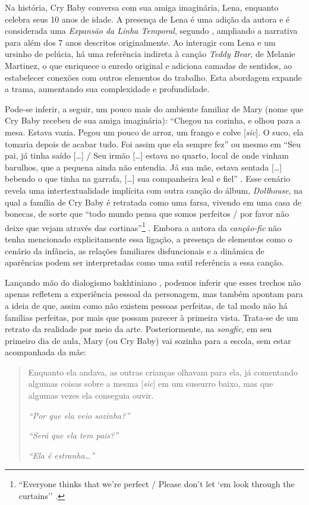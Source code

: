 Na história, Cry Baby conversa com sua amiga imaginária, Lena, enquanto
celebra seus 10 anos de idade. A presença de Lena é uma adição da autora
e é considerada uma \emph{Expansão da Linha Temporal}, segundo \textcite{jenkins_textual_1992}, ampliando a narrativa para além dos 7 anos descritos
originalmente. Ao interagir com Lena e um ursinho de pelúcia, há uma
referência indireta à canção \emph{Teddy Bear}, de Melanie Martinez, o
que enriquece o enredo original e adiciona camadas de sentidos, ao
estabelecer conexões com outros elementos do trabalho. Esta abordagem
expande a trama, aumentando sua complexidade e profundidade.

Pode-se inferir, a seguir, um pouco mais do ambiente familiar de Mary
(nome que Cry Baby recebeu de sua amiga imaginária): ``Chegou na
cozinha, e olhou para a mesa. Estava vazia. Pegou um pouco de arroz, um
frango e colve {[}\emph{sic}{]}. O suco, ela tomaria depois de acabar
tudo. Foi assim que ela sempre fez'' ou mesmo em ``Seu pai, já tinha
saído {[}\ldots{]} / Seu irmão {[}\ldots{]} estava no quarto, local de
onde vinham barulhos, que a pequena ainda não entendia. Já sua mãe,
estava sentada {[}\ldots{]} bebendo o que tinha na garrafa, {[}\ldots{]}
sua companheira leal e fiel'' \cite{brookeyoongi}. Esse cenário
revela uma intertextualidade implícita com outra canção do álbum,
\emph{Dollhouse}, na qual a família de Cry Baby é retratada como uma
farsa, vivendo em uma casa de bonecas, de sorte que ``todo mundo pensa
que somos perfeitos / por favor não deixe que vejam através das
cortinas''\footnote{``Everyone thinks that we're perfect / Please don't
  let `em look through the curtains'' \cite{dollhouse2015}.} \cite{dollhouse2015}. Embora a autora da \emph{canção-fic} não tenha mencionado
explicitamente essa ligação, a presença de elementos como o cenário da
infância, as relações familiares disfuncionais e a dinâmica de
aparências podem ser interpretadas como uma sutil referência a essa
canção.

Lançando mão do dialogismo bakhtiniano \citeyear{bakhtin2011}, podemos inferir que esses
trechos não apenas refletem a experiência pessoal da personagem, mas
também apontam para a ideia de que, assim como não existem pessoas
perfeitas, de tal modo não há famílias perfeitas, por mais que possam
parecer à primeira vista. Trata-se de um retrato da realidade por meio
da arte. Posteriormente, na \emph{songfic}, em seu primeiro dia de aula,
Mary (ou Cry Baby) vai sozinha para a escola, sem estar acompanhada da
mãe:

\begin{quote}
Enquanto ela andava, as outras crianças olhavam para ela, já comentando
algumas coisas sobre a mesma {[}\emph{sic}{]} em um sussurro baixo, mas
que algumas vezes ela conseguia ouvir.

\emph{``Por que ela veio sozinha?''}

\emph{``Será que ela tem pais?''}

\emph{``Ela é estranha\ldots''} \cite[cap.~1, grifos da autora]{brookeyoongi} %
\end{quote}

